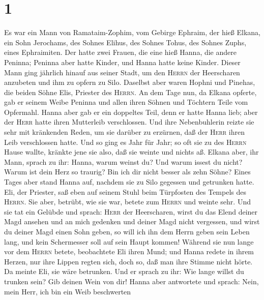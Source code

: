 \hypertarget{section}{%
\section{1}\label{section}}

 Es war ein Mann von Ramataim-Zophim, vom Gebirge Ephraim,
der hieß Elkana, ein Sohn Jerochams, des Sohnes Elihus, des Sohnes
Tohus, des Sohnes Zuphs, eines Ephraimiten.  Der hatte
zwei Frauen, die eine hieß Hanna, die andere Peninna; Peninna aber hatte
Kinder, und Hanna hatte keine Kinder.  Dieser Mann ging
jährlich hinauf aus seiner Stadt, um den \textsc{Herrn} der Heerscharen
anzubeten und ihm zu opfern zu Silo. Daselbst aber waren Hophni und
Pinehas, die beiden Söhne Elis, Priester des \textsc{Herrn}.
 An dem Tage nun, da Elkana opferte, gab er seinem Weibe
Peninna und allen ihren Söhnen und Töchtern Teile vom Opfermahl.
 Hanna aber gab er ein doppeltes Teil, denn er hatte Hanna
lieb; aber der \textsc{Herr} hatte ihren Mutterleib verschlossen.
 Und ihre Nebenbuhlerin reizte sie sehr mit kränkenden
Reden, um sie darüber zu erzürnen, daß der \textsc{Herr} ihren Leib
verschlossen hatte.  Und so ging es Jahr für Jahr; so oft
sie zu des \textsc{Herrn} Hause wallte, kränkte jene sie also, daß sie
weinte und nichts aß.  Elkana aber, ihr Mann, sprach zu
ihr: Hanna, warum weinst du? Und warum issest du nicht? Warum ist dein
Herz so traurig? Bin ich dir nicht besser als zehn Söhne? 
Eines Tages aber stand Hanna auf, nachdem sie zu Silo gegessen und
getrunken hatte. Eli, der Priester, saß eben auf seinem Stuhl beim
Türpfosten des Tempels des \textsc{Herrn}.  Sie aber,
betrübt, wie sie war, betete zum \textsc{Herrn} und weinte sehr.
 Und sie tat ein Gelübde und sprach: \textsc{Herr} der
Heerscharen, wirst du das Elend deiner Magd ansehen und an mich gedenken
und deiner Magd nicht vergessen, und wirst du deiner Magd einen Sohn
geben, so will ich ihn dem Herrn geben sein Leben lang, und kein
Schermesser soll auf sein Haupt kommen!  Während sie nun
lange vor dem \textsc{Herrn} betete, beobachtete Eli ihren Mund;
 und Hanna redete in ihrem Herzen, nur ihre Lippen regten
sich, doch so, daß man ihre Stimme nicht hörte. Da meinte Eli, sie wäre
betrunken.  Und er sprach zu ihr: Wie lange willst du
trunken sein? Gib deinen Wein von dir!  Hanna aber
antwortete und sprach: Nein, mein Herr, ich bin ein Weib beschwerten
